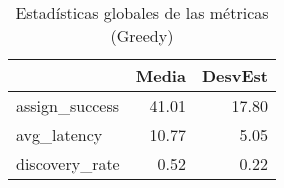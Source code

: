 \begin{table}
\caption{Estadísticas globales de las métricas (Greedy)}
\label{tab:global-stats}
\begin{tabular}{lrr}
\toprule
 & Media & DesvEst \\
\midrule
assign_success & 41.01 & 17.80 \\
avg_latency & 10.77 & 5.05 \\
discovery_rate & 0.52 & 0.22 \\
\bottomrule
\end{tabular}
\end{table}
